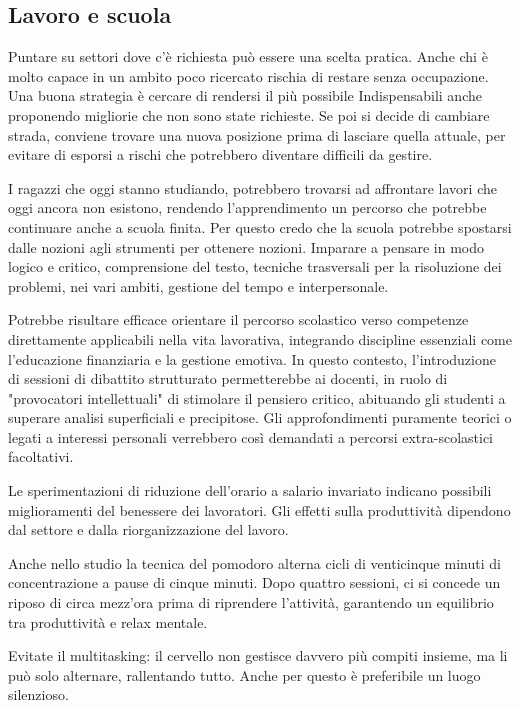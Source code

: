 \documentclass[12pt]{book} %
\begin{document}
\subsection{Lavoro e scuola}

Puntare su settori dove c'è richiesta può essere una scelta pratica. Anche chi è molto capace in un ambito poco ricercato rischia di restare senza occupazione. Una buona strategia è cercare di rendersi il più possibile Indispensabili anche proponendo migliorie che non sono state richieste. Se poi si decide di cambiare strada, conviene trovare una nuova posizione prima di lasciare quella attuale, per evitare di esporsi a rischi che potrebbero diventare difficili da gestire.

I ragazzi che oggi stanno studiando, potrebbero trovarsi ad affrontare lavori che oggi ancora non esistono, rendendo l'apprendimento un percorso che potrebbe continuare anche a scuola finita. Per questo credo che la scuola potrebbe spostarsi dalle nozioni agli strumenti per ottenere nozioni. Imparare a pensare in modo logico e critico, comprensione del testo, tecniche trasversali per la risoluzione dei problemi, nei vari ambiti, gestione del tempo e interpersonale.

Potrebbe risultare efficace orientare il percorso scolastico verso competenze direttamente applicabili nella vita lavorativa, integrando discipline essenziali come l'educazione finanziaria e la gestione emotiva.
In questo contesto, l'introduzione di sessioni di dibattito strutturato permetterebbe ai docenti, in ruolo di "provocatori intellettuali" di stimolare il pensiero critico, abituando gli studenti a superare analisi superficiali e precipitose. Gli approfondimenti puramente teorici o legati a interessi personali verrebbero così demandati a percorsi extra-scolastici facoltativi.

\begin{mdframed}[linewidth=1pt]
Le sperimentazioni di riduzione dell’orario a salario invariato indicano possibili miglioramenti del benessere dei lavoratori. Gli effetti sulla produttività dipendono dal settore e dalla riorganizzazione del lavoro.

Anche nello studio la tecnica del pomodoro alterna cicli di venticinque minuti di concentrazione a pause di cinque minuti. Dopo quattro sessioni, ci si concede un riposo di circa mezz'ora prima di riprendere l'attività, garantendo un equilibrio tra produttività e relax mentale.

Evitate il multitasking: il cervello non gestisce davvero più compiti insieme, ma li può solo alternare, rallentando tutto. Anche per questo è preferibile un luogo silenzioso.
\end{mdframed}
\end{document}
